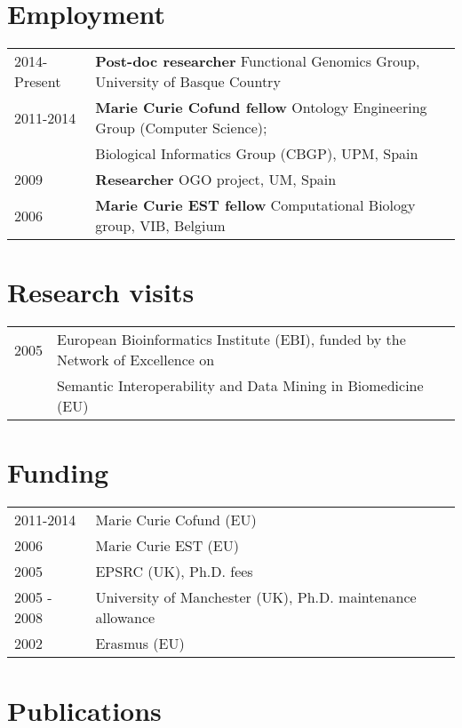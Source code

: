 \documentclass[11pt,fullpage]{article}
\begin{document}
\section*{Employment}


\begin{tabular}{ll}
 2014-Present & {\bf Post-doc researcher} Functional Genomics Group, University of Basque Country  \\
 2011-2014 & {\bf Marie Curie Cofund fellow} Ontology Engineering Group (Computer Science); \\ 
	    &Biological Informatics Group (CBGP), UPM, Spain \\
 2009 & {\bf Researcher} OGO project, UM, Spain \\
 2006 & {\bf Marie Curie EST fellow} Computational Biology group, VIB, Belgium \\
\end{tabular}

\section*{Research visits}

\begin{tabular}{ll}
 2005 & European Bioinformatics Institute (EBI), funded by the Network of Excellence on \\ 
      & Semantic Interoperability and Data Mining in Biomedicine (EU)

\end{tabular}   

\section*{Funding}

\begin{tabular}{ll}
	2011-2014 & Marie Curie Cofund (EU) \\  
	2006 & Marie Curie EST (EU) \\
	2005 & EPSRC (UK), Ph.D. fees \\
	2005 - 2008 & University of Manchester (UK), Ph.D. maintenance allowance \\
	2002 & Erasmus (EU) \\
\end{tabular}

\section*{Publications}
 
\end{document}
